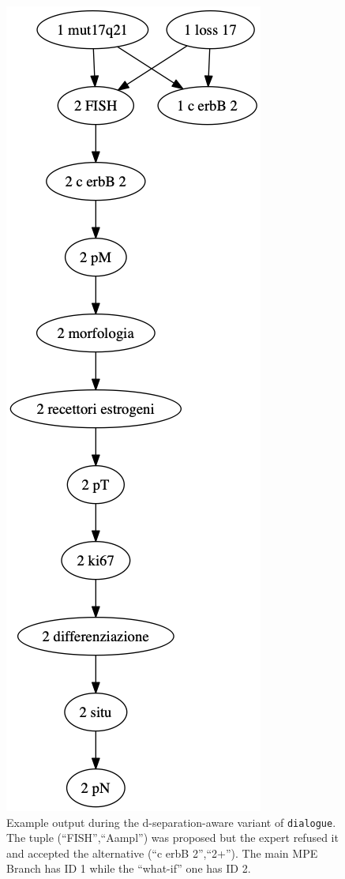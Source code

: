\begin{figure}[htbp]
\centerline{\includegraphics[scale=0.2]{methodology/images/alternative-explanation-tree-example}}
\caption{Example output during the d-separation-aware variant of \texttt{dialogue}.
	The tuple (\enquote{FISH},\enquote{Aampl}) was proposed but the expert refused it and accepted the alternative (\enquote{c erbB 2},\enquote{2+}).
	The main MPE Branch has ID 1 while the \enquote{what-if} one has ID 2.}
\label{fig:alternative-branch}
\end{figure}

